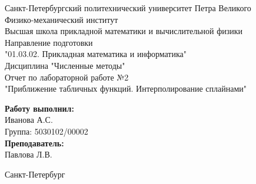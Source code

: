 \begin{titlepage}	%

	\begin{center}		%

		\large Санкт-Петербургский политехнический университет Петра Великого\\
		\large Физико-механический институт \\
		\large Высшая школа прикладной математики и вычислительной физики\\[3cm]
		\large Направление подготовки\\
		\large "01.03.02. Прикладная математика и информатика"\\[3cm]
		\huge Дисциплина "Численные методы"\\[0.5cm] %
		\large Отчет по лабораторной работе №2\\[0.1cm]
		\large "Приближение табличных функций. Интерполирование сплайнами"\\[5cm]

	\end{center}


	\begin{flushright} %
		\begin{minipage}{0.25\textwidth} %
			\begin{flushleft} %

				\large\textbf{Работу выполнил:}\\
				\large Иванова А.С.\\
				\large {Группа:} 5030102/00002\\
				
				\large \textbf{Преподаватель:}\\
				\large Павлова Л.В.

			\end{flushleft}
		\end{minipage}
	\end{flushright}
	
	\vfill %

	\begin{center}
	\large Санкт-Петербург\\
	\large \the\year %
	\end{center} %

\end{titlepage} %

\vfill %
